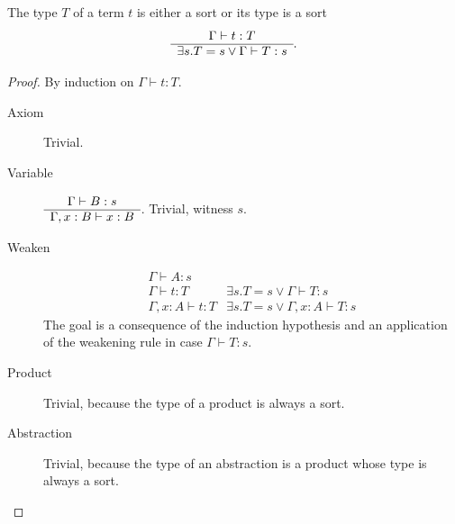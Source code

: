 \documentclass[12pt]{article}
\begin{document}
\begin{theorem} The type $T$ of a term $t$ is either a sort or its type is a
  sort
  $$
  \begin{array}{c} \Gamma \vdash t:T \\ \hline \exists s. T = s \lor \Gamma\vdash T:s\end{array}.
  $$

  \begin{proof}
    By induction on $\Gamma\vdash t:T$.
    \begin{description}

    \item[Axiom] Trivial.


    \item[Variable]
      $\begin{array}{c} \Gamma\vdash B:s \\ \hline \Gamma,x:B \vdash x:B\end{array}
      $. Trivial, witness $s$.

    \item[Weaken]
      $$
      \begin{array}{l|l}
        \Gamma \vdash A:s &
        \\
        \Gamma \vdash t:T & \exists s. T = s \lor \Gamma \vdash T:s
        \\
        \hline
        \Gamma,x:A \vdash t:T   & \exists s.
                                  T = s \lor \Gamma,x:A \vdash T:s
      \end{array}
      $$
      The goal is a consequence of the induction hypothesis and an
      application of the weakening rule in case $\Gamma\vdash T:s$.

    \item[Product] Trivial, because the type of a product is always a sort.

    \item[Abstraction] Trivial, because the type of an abstraction is a
      product whose type is always a sort.


\end{description}
\end{proof}
\end{theorem}
\end{document}
